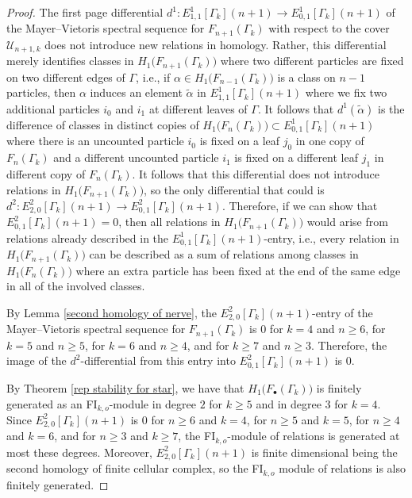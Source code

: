 \documentclass[pagebackref,colorlinks,citecolor=blue,linkcolor=blue,urlcolor=blue,filecolor=blue]{article}
\theoremstyle{definition}\newtheorem{definition}[thm]{Definition}
\theoremstyle{definition}
\begin{document}
\begin{proof}
The first page differential $d^{1}:E^{1}_{1,1}[\Gamma_{k}](n+1)\to E^{1}_{0,1}[\Gamma_{k}](n+1)$ of the Mayer--Vietoris spectral sequence for $F_{n+1}(\Gamma_{k})$ with respect to the cover $\mathcal{U}_{n+1,k}$ does not introduce new relations in homology.
Rather, this differential merely identifies classes in $H_{1}\big(F_{n+1}(\Gamma_{k})\big)$ where two different particles are fixed on two different edges of $\Gamma$, i.e., if $\alpha\in H_{1}\big(F_{n-1}(\Gamma_{k})\big)$ is a class on $n-1$ particles, then $\alpha$ induces an element $\tilde{\alpha}$ in $E^{1}_{1,1}[\Gamma_{k}](n+1)$ where we fix two additional particles $i_{0}$ and $i_{1}$ at different leaves of $\Gamma$.
It follows that $d^{1}(\tilde{\alpha})$ is the difference of classes in distinct copies of $H_{1}\big(F_{n}(\Gamma_{k})\big)\subset E^{1}_{0,1}[\Gamma_{k}](n+1)$ where there is an uncounted particle $i_{0}$ is fixed on a leaf $j_{0}$ in one copy of $F_{n}(\Gamma_{k})$ and a different uncounted particle $i_{1}$ is fixed on a different leaf $j_{1}$ in different copy of $F_{n}(\Gamma_{k})$.
It follows that this differential does not introduce relations in $H_{1}\big(F_{n+1}(\Gamma_{k})\big)$, so the only differential that could is $d^{2}:E^{2}_{2, 0}[\Gamma_{k}](n+1)\to E^{2}_{0,1}[\Gamma_{k}](n+1)$. 
Therefore, if we can show that $E^{2}_{0,1}[\Gamma_{k}](n+1)=0$, then all relations in $H_{1}\big(F_{n+1}(\Gamma_{k})\big)$ would arise from relations already described in the $E^{1}_{0,1}[\Gamma_{k}](n+1)$-entry, i.e., every relation in $H_{1}\big(F_{n+1}(\Gamma_{k})\big)$ can be described as a sum of relations among classes in $H_{1}\big(F_{n}(\Gamma_{k})\big)$ where an extra particle has been fixed at the end of the same edge in all of the involved classes.

By Lemma \ref{second homology of nerve}, the $E^{2}_{2, 0}[\Gamma_{k}](n+1)$-entry of the Mayer--Vietoris spectral sequence for $F_{n+1}(\Gamma_{k})$ is $0$ for $k=4$ and $n\ge 6$, for $k=5$ and $n\ge 5$, for $k=6$ and $n\ge 4$, and for $k\ge 7$ and $n\ge 3$.
Therefore, the image of the $d^{2}$-differential from this entry into $E^{2}_{0,1}[\Gamma_{k}](n+1)$ is $0$.

By Theorem \ref{rep stability for star}, we have that $H_{1}\big(F_{\bullet}(\Gamma_{k})\big)$ is finitely generated as an FI$_{k,o}$-module in degree $2$ for $k\ge 5$ and in degree $3$ for $k=4$.
Since $E^{2}_{2,0}[\Gamma_{k}](n+1)$ is $0$ for $n\ge 6$ and $k=4$, for $n\ge 5$ and $k=5$, for $n\ge 4$ and $k=6$, and for $n\ge 3$ and $k\ge 7$, the FI$_{k,o}$-module of relations is generated at most these degrees.
Moreover, $E^{2}_{2,0}[\Gamma_{k}](n+1)$ is finite dimensional being the second homology of finite cellular complex, so the FI$_{k,o}$ module of relations is also finitely generated.


\end{proof}
\end{document}
